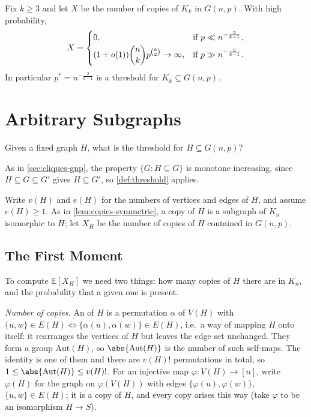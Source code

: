 \begin{theorem}\label{thm:clique-threshold}
    Fix \(k \ge 3\) and let \(X\) be the number of copies of \(K_k\) in \(G(n,p)\). With high probability,
    \[
        X = \begin{cases}
            0, & \text{if } p \ll n^{-\frac{2}{k-1}}, \\[2pt]
            (1+o(1)) \dbinom{n}{k} p^{\binom{k}{2}} \to \infty, & \text{if } p \gg n^{-\frac{2}{k-1}}.
        \end{cases}
    \]
    In particular \(p^{*} = n^{-\frac{2}{k-1}}\) is a threshold for \(K_k \subseteq G(n,p)\).
\end{theorem}

\section{Arbitrary Subgraphs}\label{sec:subgraph-threshold}

\begin{question}\label{q:subgraph-threshold}
    Given a fixed graph \(H\), what is the threshold for \(H \subseteq G(n,p)\)?
\end{question}

As in \autoref{sec:cliques-gnp}, the property \(\{G : H \subseteq G\}\) is monotone increasing, since \(H \subseteq G \subseteq G'\) gives \(H \subseteq G'\), so \autoref{def:threshold} applies.

Write \(v(H)\) and \(e(H)\) for the numbers of vertices and edges of \(H\), and assume \(e(H) \ge 1\). As in \autoref{lem:copies-symmetric}, a copy of \(H\) is a subgraph of \(K_n\) isomorphic to \(H\); let \(X_H\) be the number of copies of \(H\) contained in \(G(n,p)\).

\subsection{The First Moment}

To compute \(\mathbb{E}[X_H]\) we need two things: how many copies of \(H\) there are in \(K_n\), and the probability that a given one is present.

\emph{Number of copies.} An  of \(H\) is a permutation \(\alpha\) of \(V(H)\) with \(\{u,w\} \in E(H) \iff \{\alpha(u), \alpha(w)\} \in E(H)\), i.e.\ a way of mapping \(H\) onto itself: it rearranges the vertices of \(H\) but leaves the edge set unchanged. They form a group \(\mathrm{Aut}(H)\), so \(\abs{\mathrm{Aut}(H)}\) is the number of such self-maps. The identity is one of them and there are \(v(H)!\) permutations in total, so \(1 \le \abs{\mathrm{Aut}(H)} \le v(H)!\). For an injective map \(\varphi \colon V(H) \to [n]\), write \(\varphi(H)\) for the graph on \(\varphi(V(H))\) with edges \(\{\varphi(u), \varphi(w)\}\), \(\{u,w\} \in E(H)\); it is a copy of \(H\), and every copy arises this way (take \(\varphi\) to be an isomorphism \(H \to S\)).

